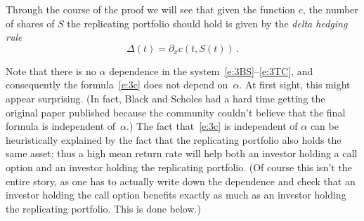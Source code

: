 \begin{remark}
  Through the course of the proof we will see that given the function $c$, the number of shares of $S$ the replicating portfolio should hold is given by the \emph{delta hedging rule}
  \begin{equation}\label{e:3DH}
    \Delta(t) = \partial_x c(t, S(t)) \,.
  \end{equation}
\end{remark}
\begin{remark}
  Note that there is no $\alpha$ dependence in the system~\eqref{e:3BS}--\eqref{e:3TC}, and consequently the formula~\eqref{e:3c} does not depend on~$\alpha$.
  At first sight, this might appear surprising.
  (In fact, Black and Scholes had a hard time getting the original paper published because the community couldn't believe that the final formula is independent of~$\alpha$.)
  The fact that~\eqref{e:3c} is independent of $\alpha$ can be heuristically explained by the fact that the replicating portfolio also holds the same asset: thus a high mean return rate will help both an investor holding a call option and an investor holding the replicating portfolio.
  (Of course this isn't the entire story, as one has to actually write down the dependence and check that an investor holding the call option benefits exactly as much as an investor holding the replicating portfolio.
  This is done below.)
\end{remark}

